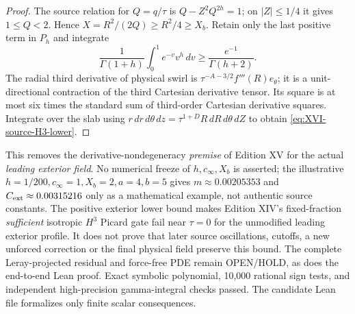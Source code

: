 \begin{proof}
The source relation for $Q=q/\tau$ is
$Q-Z^2Q^{2h}=1$; on $|Z|\le1/4$ it gives $1\le Q<2$.
Hence $X=R^2/(2Q)\ge R^2/4\ge X_b$.
Retain only the last positive term in $P_h$ and integrate
\[
\frac1{\Gamma(1+h)}\int_0^1e^{-v}v^h\,dv
\ge \frac{e^{-1}}{\Gamma(h+2)}.
\]
The radial third derivative of physical swirl is
$\tau^{-A-3/2}f'''(R)e_\theta$; it is a unit-directional
contraction of the third Cartesian derivative tensor.
Its square is at most six times the standard sum of
third-order Cartesian derivative squares. Integrate over
the slab using $r\,dr\,d\theta\,dz=
\tau^{1+D}R\,dR\,d\theta\,dZ$ to obtain
\eqref{eq:XVI-source-H3-lower}.
\end{proof}
This removes the derivative-nondegeneracy \emph{premise} of
Edition XV for the actual \emph{leading exterior field}.
No numerical freeze of $h,c_\infty,X_b$ is asserted;
the illustrative $h=1/200,c_\infty=1,X_b=2,a=4,b=5$
gives $m\approx0.00205353$ and $C_{\rm ext}\approx0.00315216$
only as a mathematical example, not authentic source constants.
The positive exterior lower bound makes Edition XIV's
fixed-fraction \emph{sufficient} isotropic $H^3$ Picard gate fail
near $\tau=0$ for the unmodified leading exterior profile.
It does not prove that later source oscillations, cutoffs, a
new unforced correction or the final physical field preserve
this bound. The complete Leray-projected residual and
force-free PDE remain OPEN/HOLD, as does the end-to-end Lean proof.
Exact symbolic polynomial, 10,000 rational sign tests, and
independent high-precision gamma-integral checks passed.
The candidate Lean file formalizes only finite scalar consequences.